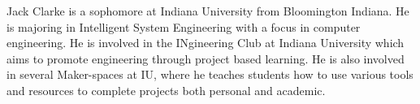 Jack Clarke is a sophomore at Indiana University from Bloomington Indiana. He is majoring in Intelligent System Engineering with a focus in computer engineering. He is involved in the INgineering Club at Indiana University which aims to promote engineering through project based learning. He is also involved in several Maker-spaces at IU, where he teaches students how to use various tools and resources to complete projects both personal and academic.
